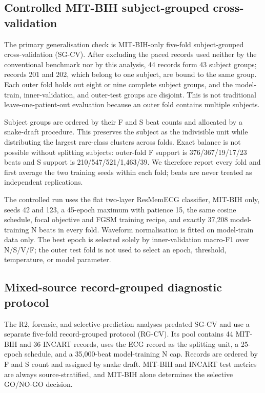 \documentclass[pdflatex,sn-mathphys-num]{sn-jnl}
\begin{document}
\subsection{Controlled MIT-BIH subject-grouped cross-validation}
\label{sec:sgcv}
The primary generalisation check is MIT-BIH-only five-fold subject-grouped
cross-validation (SG-CV). After excluding the paced records used neither by the
conventional benchmark nor by this analysis, 44 records form 43 subject groups;
records 201 and 202, which belong to one subject, are bound to the same group.
Each outer fold holds out eight or nine complete subject groups, and the
model-train, inner-validation, and outer-test groups are disjoint. This is not
traditional leave-one-patient-out evaluation because an outer fold contains
multiple subjects.

Subject groups are ordered by their F and S beat counts and allocated by a
snake-draft procedure. This preserves the subject as the indivisible unit while
distributing the largest rare-class clusters across folds. Exact balance is not
possible without splitting subjects: outer-fold F support is
376/367/19/17/23 beats and S support is 210/547/521/1,463/39. We therefore
report every fold and first average the two training seeds within each fold;
beats are never treated as independent replications.

The controlled run uses the flat two-layer ResMemECG classifier, MIT-BIH only,
seeds 42 and 123, a 45-epoch maximum with patience 15, the same cosine schedule,
focal objective and FGSM training recipe, and exactly 37,208 model-training N
beats in every fold. Waveform normalisation is fitted on model-train data only.
The best epoch is selected solely by inner-validation macro-F1 over N/S/V/F;
the outer test fold is not used to select an epoch, threshold, temperature, or
model parameter.

\subsection{Mixed-source record-grouped diagnostic protocol}
\label{sec:rgcv}
The R2, forensic, and selective-prediction analyses predated SG-CV and use a
separate five-fold record-grouped protocol (RG-CV). Its pool contains 44
MIT-BIH and 36 INCART records, uses the ECG record as the splitting unit, a
25-epoch schedule, and a 35,000-beat model-training N cap. Records are ordered
by F and S count and assigned by snake draft. MIT-BIH and INCART test metrics
are always source-stratified, and MIT-BIH alone determines the selective
GO/NO-GO decision.
\end{document}
